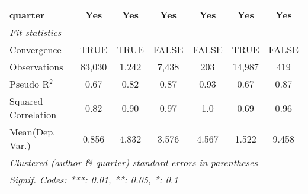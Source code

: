 \begin{tabular}{lcccccc}
   quarter                                                    & Yes           & Yes           & Yes           & Yes          & Yes           & Yes\\  
   \midrule
   \emph{Fit statistics}\\
   Convergence                                                &TRUE           & TRUE          & FALSE         & FALSE        & TRUE          & FALSE\\  
   Observations                                               & 83,030        & 1,242         & 7,438         & 203          & 14,987        & 419\\  
   Pseudo R$^2$                                               & 0.67          & 0.82          & 0.87          & 0.93         & 0.67          & 0.87\\  
   Squared Correlation                                        & 0.82          & 0.90          & 0.97          & 1.0          & 0.69          & 0.96\\  
Mean(Dep. Var.) & 0.856 & 4.832 & 3.576 & 4.567 & 1.522 & 9.458 \\
   \midrule \midrule
   \multicolumn{7}{l}{\emph{Clustered (author \& quarter) standard-errors in parentheses}}\\
   \multicolumn{7}{l}{\emph{Signif. Codes: ***: 0.01, **: 0.05, *: 0.1}}\\
\end{tabular}
\par\endgroup
